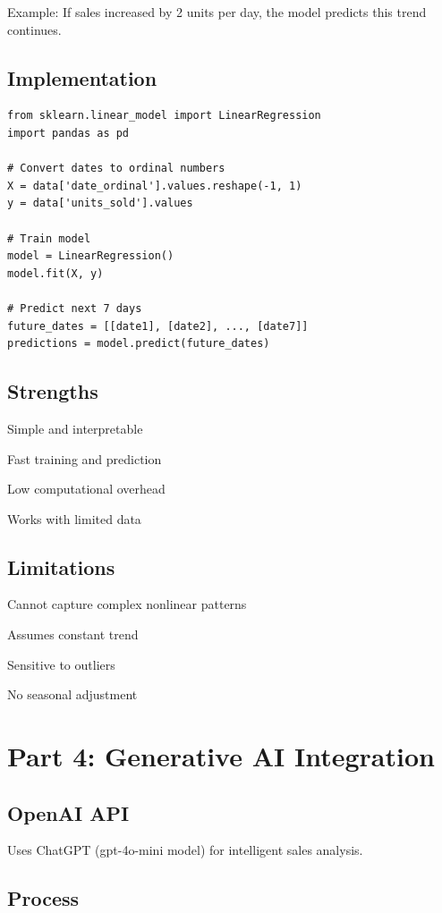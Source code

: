 \documentclass{article}
\begin{document}
Example: If sales increased by 2 units per day, the model predicts this trend continues.

\subsection{Implementation}

\begin{verbatim}
from sklearn.linear_model import LinearRegression
import pandas as pd

# Convert dates to ordinal numbers
X = data['date_ordinal'].values.reshape(-1, 1)
y = data['units_sold'].values

# Train model
model = LinearRegression()
model.fit(X, y)

# Predict next 7 days
future_dates = [[date1], [date2], ..., [date7]]
predictions = model.predict(future_dates)
\end{verbatim}

\subsection{Strengths}

Simple and interpretable

Fast training and prediction

Low computational overhead

Works with limited data

\subsection{Limitations}

Cannot capture complex nonlinear patterns

Assumes constant trend

Sensitive to outliers

No seasonal adjustment

\section{Part 4: Generative AI Integration}

\subsection{OpenAI API}

Uses ChatGPT (gpt-4o-mini model) for intelligent sales analysis.

\subsection{Process}
\end{document}
